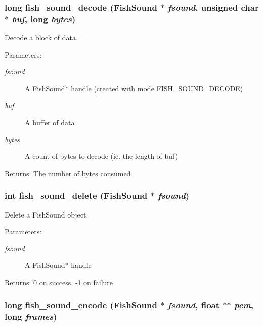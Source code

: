 \subsubsection{\setlength{\rightskip}{0pt plus 5cm}long fish\_\-sound\_\-decode ({\bf Fish\-Sound} $\ast$ {\em fsound}, unsigned char $\ast$ {\em buf}, long {\em bytes})}\label{fishsound_8h_a7}


Decode a block of data. 

\begin{Desc}
\item[Parameters:]
\begin{description}
\item[{\em fsound}]A Fish\-Sound$\ast$ handle (created with mode FISH\_\-SOUND\_\-DECODE) \item[{\em buf}]A buffer of data \item[{\em bytes}]A count of bytes to decode (ie. the length of buf) \end{description}
\end{Desc}
\begin{Desc}
\item[Returns:]The number of bytes consumed \end{Desc}
\subsubsection{\setlength{\rightskip}{0pt plus 5cm}int fish\_\-sound\_\-delete ({\bf Fish\-Sound} $\ast$ {\em fsound})}\label{fishsound_8h_a11}


Delete a Fish\-Sound object. 

\begin{Desc}
\item[Parameters:]
\begin{description}
\item[{\em fsound}]A Fish\-Sound$\ast$ handle \end{description}
\end{Desc}
\begin{Desc}
\item[Returns:]0 on success, -1 on failure \end{Desc}
\subsubsection{\setlength{\rightskip}{0pt plus 5cm}long fish\_\-sound\_\-encode ({\bf Fish\-Sound} $\ast$ {\em fsound}, float $\ast$$\ast$ {\em pcm}, long {\em frames})}\label{fishsound_8h_a8}



